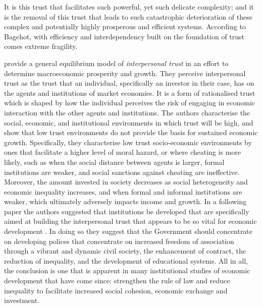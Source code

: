 \begin{subappendices}
It is this trust that facilitates such powerful, yet such delicate complexity; and it is the removal of this trust that leads to such catastrophic deterioration of these complex and potentially highly prosperous and efficient systems. According to Bagehot, with efficiency and interdependency built on the foundation of trust comes extreme fragility.

\citet{ZakKnack2001} provide a general equilibrium model of \textit{interpersonal trust} in an effort to determine macroeconomic prosperity and growth. They perceive interpersonal trust as the trust that an individual, specifically an investor in their case, has on the agents and institutions of market economies. It is a form of rationalised trust which is shaped by how the individual perceives the risk of engaging in economic interaction with the other agents and institutions. The authors characterise the social, economic, and institutional environments in which trust will be high, and show that low trust environments do not provide the basis for sustained economic growth. Specifically, they characterise low trust socio-economic environments by ones that facilitate a higher level of  moral hazard, or where cheating is more likely, such as when the social distance between agents is larger, formal institutions are weaker, and social sanctions against cheating are ineffective. Moreover, the amount invested in society decreases as social heterogeneity and economic inequality increases, and when formal and informal institutions are weaker, which ultimately adversely impacts income and growth. In a following paper the authors suggested that institutions be developed that are specifically aimed at building the interpersonal trust that appears to be so vital for economic development \citep{KnackZak2003}. In doing so they suggest that the Government should concentrate on developing polices that concentrate on increased freedom of association through a vibrant and dynamic civil society, the enhancement of contract, the reduction of inequality, and the development of educational systems. All in all, the conclusion is one that is apparent in many institutional studies of economic development that have come since: strengthen the rule of law and reduce inequality to facilitate increased social cohesion, economic exchange and investment.


\end{subappendices}
